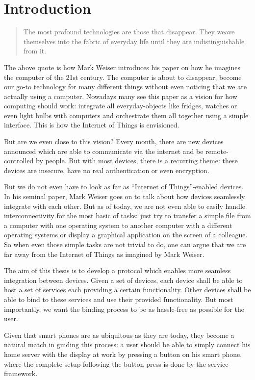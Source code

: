 \section{Introduction}

\begin{quote}
    The most profound technologies are those that disappear.
    They weave themselves into the fabric of everyday life until they are indistinguishable from it. \cite{weiser1991computer}
\end{quote}

The above quote is how Mark Weiser introduces his paper on how he imagines the computer of the 21st century.
The computer is about to disappear, become our go-to technology for many different things without even noticing that we are actually using a computer.
Nowadays many see this paper as a vision for how computing should work: integrate all everyday-objects like fridges, watches or even light bulbs with computers and orchestrate them all together using a simple interface.
This is how the Internet of Things is envisioned.

But are we even close to this vision?
Every month, there are new devices announced which are able to communicate via the internet and be remote-controlled by people.
But with most devices, there is a recurring theme: these devices are insecure, have no real authentication or even encryption.

But we do not even have to look as far as ``Internet of Things''-enabled devices.
In his seminal paper, Mark Weiser goes on to talk about how devices seamlessly integrate with each other.
But as of today, we are not even able to easily handle interconnectivity for the most basic of tasks: just try to transfer a simple file from a computer with one operating system to another computer with a different operating systems or display a graphical application on the screen of a colleague.
So when even those simple tasks are not trivial to do, one can argue that we are far away from the Internet of Things as imagined by Mark Weiser.

The aim of this thesis is to develop a protocol which enables more seamless integration between devices.
Given a set of devices, each device shall be able to host a set of services each providing a certain functionality.
Other devices shall be able to bind to these services and use their provided functionality.
But most importantly, we want the binding process to be as hassle-free as possible for the user.

Given that smart phones are as ubiquitous as they are today, they become a natural match in guiding this process:
a user should be able to simply connect his home server with the display at work by pressing a button on his smart phone, where the complete setup following the button press is done by the service framework.

